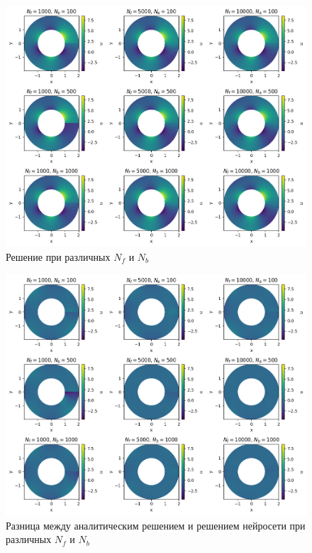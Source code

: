 \documentclass[a4paper,14pt]{extarticle} %
\begin{document}
\begin{figure}[ht]
    \center
    \includegraphics[width=\textwidth]{../plots/termal/solut l = (20x4) Nf=[1000, 5000, 10000] Nu=[100, 500, 1000].png}
    \caption{Решение при различных $N_f$ и $N_b$}
    \label{fig:termal_pred}
\end{figure}

\begin{figure}[ht]
    \center
    \includegraphics[width=\textwidth]{../plots/termal/solut dif l = (20x4) Nf=[1000, 5000, 10000] Nu=[100, 500, 1000].png}
    \caption{Разница между аналитическим решением и решением нейросети при различных $N_f$ и $N_b$}
    \label{fig:termal_dif}
\end{figure}
\end{document}
